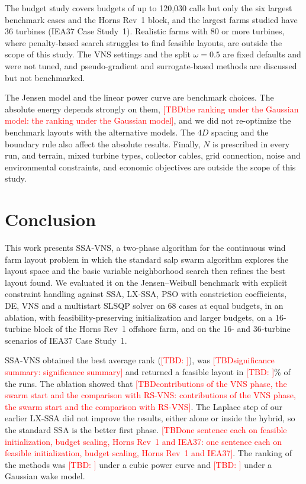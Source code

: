 \documentclass[journal,twoside]{IEEEtran}
\newcommand{\TBD}[1]{\textcolor{red}{[TBD\ifx\relax#1\relax\else: #1\fi]}}
\begin{document}
The budget study covers budgets of up to 120,030 calls but only the six largest benchmark cases and the Horns Rev~1 block, and the largest farms studied have 36 turbines (IEA37 Case Study~1). Realistic farms with 80 or more turbines, where penalty-based search struggles to find feasible layouts, are outside the scope of this study. The VNS settings and the split $\omega=0.5$ are fixed defaults and were not tuned, and pseudo-gradient and surrogate-based methods are discussed but not benchmarked.

The Jensen model and the linear power curve are benchmark choices. The absolute energy depends strongly on them, \TBD{the ranking under the Gaussian model}, and we did not re-optimize the benchmark layouts with the alternative models. The $4D$ spacing and the boundary rule also affect the absolute results. Finally, $N$ is prescribed in every run, and terrain, mixed turbine types, collector cables, grid connection, noise and environmental constraints, and economic objectives are outside the scope of this study.

\section{Conclusion}
\label{sec:conclusion}
This work presents SSA-VNS, a two-phase algorithm for the continuous wind farm layout problem in which the standard salp swarm algorithm explores the layout space and the basic variable neighborhood search then refines the best layout found. We evaluated it on the Jensen--Weibull benchmark with explicit constraint handling against SSA, LX-SSA, PSO with constriction coefficients, DE, VNS and a multistart SLSQP solver on 68 cases at equal budgets, in an ablation, with feasibility-preserving initialization and larger budgets, on a 16-turbine block of the Horns Rev~1 offshore farm, and on the 16- and 36-turbine scenarios of IEA37 Case Study~1.

SSA-VNS obtained the best average rank (\TBD{}), was \TBD{significance summary} and returned a feasible layout in \TBD{}\% of the runs. The ablation showed that \TBD{contributions of the VNS phase, the swarm start and the comparison with RS-VNS}. The Laplace step of our earlier LX-SSA did not improve the results, either alone or inside the hybrid, so the standard SSA is the better first phase. \TBD{one sentence each on feasible initialization, budget scaling, Horns Rev~1 and IEA37}. The ranking of the methods was \TBD{} under a cubic power curve and \TBD{} under a Gaussian wake model.
\end{document}

